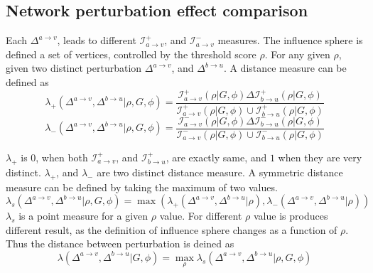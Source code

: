 \documentclass{article}
\begin{document}
\subsection{Network perturbation effect comparison}
Each $\Delta^{a\rightarrow v}$, leads to different $\mathcal{I}^{+}_{a\rightarrow v}$, and $\mathcal{I}^{-}_{a\rightarrow v}$ measures. The influence sphere is defined a set of vertices, controlled by the threshold score $\rho$. For any given $\rho$, given two distinct perturbation $\Delta^{a\rightarrow v}$, and $\Delta^{b\rightarrow u}$. A distance measure can be defined as 
\begin{equation*}
    \lambda_{+}( \Delta^{a\rightarrow v}, \Delta^{b\rightarrow u} \vert \rho, G, \phi) = \dfrac{\mathcal{I}^{+}_{a\rightarrow v}(\rho \vert G, \phi) \Delta \mathcal{I}^{+}_{b\rightarrow u}(\rho \vert G, \phi)}{\mathcal{I}^{+}_{a\rightarrow v}(\rho \vert G, \phi) \cup \mathcal{I}^{+}_{b\rightarrow u}(\rho \vert G, \phi)}
\end{equation*}
\begin{equation*}
    \lambda_{-}( \Delta^{a\rightarrow v}, \Delta^{b\rightarrow u} \vert \rho, G, \phi) = \dfrac{\mathcal{I}^{-}_{a\rightarrow v}(\rho \vert G, \phi) \Delta \mathcal{I}^{-}_{b\rightarrow u}(\rho \vert G, \phi)}{\mathcal{I}^{-}_{a\rightarrow v}(\rho \vert G, \phi) \cup \mathcal{I}^{-}_{b\rightarrow u}(\rho \vert G, \phi)}
\end{equation*}

$\lambda_{+}$ is $0$, when both $\mathcal{I}^{+}_{a\rightarrow v}$, and $\mathcal{I}^{+}_{b\rightarrow u}$, are exactly same, and $1$ when they are very distinct. $\lambda_{+}$, and $\lambda_{-}$ are two distinct distance measure. A symmetric distance measure can be defined by taking the maximum of two values.
\begin{equation*}
    \lambda_{s}(\Delta^{a\rightarrow v}, \Delta^{b\rightarrow u}\vert \rho, G, \phi) = \max (\lambda_{+}( \Delta^{a\rightarrow v}, \Delta^{b\rightarrow u} \vert \rho) , \lambda_{-}( \Delta^{a\rightarrow v}, \Delta^{b\rightarrow u} \vert \rho) )
\end{equation*}
$\lambda_{s}$ is a point measure for a given $\rho$ value. For different $\rho$ value is produces different result, as the definition of influence sphere changes as a function of $\rho$. Thus the distance between perturbation is deined as 
\begin{equation*}
    \lambda(\Delta^{a\rightarrow v}, \Delta^{b\rightarrow u}\vert G,\phi) = \max_{\rho} \lambda_{s}(\Delta^{a\rightarrow v}, \Delta^{b\rightarrow u}\vert \rho, G, \phi)
\end{equation*}
\end{document}

